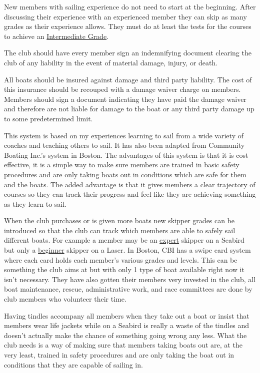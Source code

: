 \documentclass[12pt]{scrartcl}
\begin{document}
New members with sailing experience do not need to start at the beginning. After discussing their experience with an experienced member they can skip as many grades as their experience allows. They must do at least the tests for the courses to achieve an \hyperlink{grade:intermediate}{Intermediate Grade}.

The club should have every member sign an indemnifying document clearing the club of any liability in the event of material damage, injury, or death.

All boats should be insured against damage and third party liability. The cost of this insurance should be recouped with a damage waiver charge on members. Members should sign a document indicating they have paid the damage waiver and therefore are not liable for damage to the boat or any third party damage up to some predetermined limit.

This system is based on my experiences learning to sail from a wide variety of coaches and teaching others to sail. It has also been adapted from Community Boating Inc.’s system in Boston. The advantages of this system is that it is cost effective, it is a simple way to make sure members are trained in basic safety procedures and are only taking boats out in conditions which are safe for them and the boats. The added advantage is that it gives members a clear trajectory of courses so they can track their progress and feel like they are achieving something as they learn to sail.

When the club purchases or is given more boats new skipper grades can be introduced so that the club can track which members are able to safely sail different boats. For example a member may be an \hyperlink{grade:expert}{expert} skipper on a Seabird but only a \hyperlink{grade:beginner}{beginner} skipper on a Laser. In Boston, CBI has a swipe card system where each card holds each member’s various grades and levels. This can be something the club aims at but with only 1 type of boat available right now it isn’t necessary. They have also gotten their members very invested in the club, all boat maintenance, rescue, administrative work, and race committees are done by club members who volunteer their time.

Having tindles accompany all members when they take out a boat or insist that members wear life jackets while on a Seabird is really a waste of the tindles and doesn’t actually make the chance of something going wrong any less. What the club needs is a way of making sure that members taking boats out are, at the very least, trained in safety procedures and are only taking the boat out in conditions that they are capable of sailing in.
\end{document}
